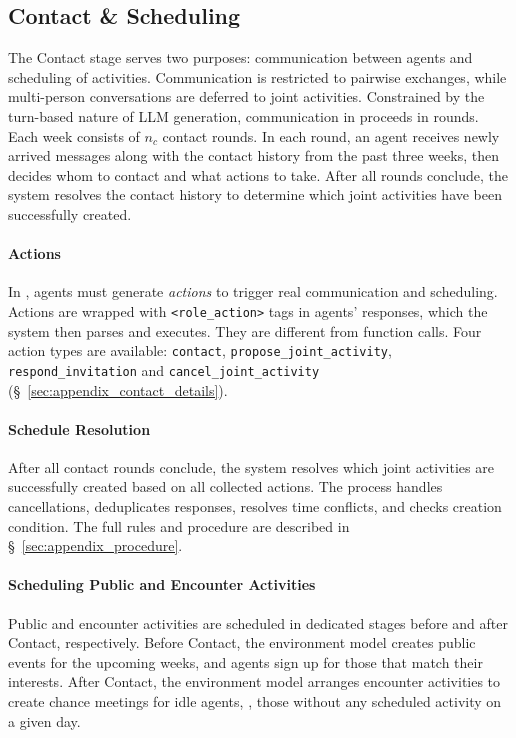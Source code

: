 \subsection{Contact \& Scheduling}
\label{sec:contact}

The Contact stage serves two purposes: communication between agents and scheduling of activities.
Communication is restricted to pairwise exchanges, while multi-person conversations are deferred to joint activities.
Constrained by the turn-based nature of LLM generation, communication in \method proceeds in rounds.
Each week consists of $n_c$ contact rounds.
In each round, an agent receives newly arrived messages along with the contact history from the past three weeks, then decides whom to contact and what actions to take.
After all rounds conclude, the system resolves the contact history to determine which joint activities have been successfully created.

\paragraph{Actions}
In \method, agents must generate \textit{actions} to trigger real communication and scheduling.
Actions are wrapped with \texttt{<role\_action>} tags in agents' responses, which the system then parses and executes.
They are different from function calls.
Four action types are available: \texttt{contact}, \texttt{propose\_joint\_activity}, \texttt{respond\_invitation} and \texttt{cancel\_joint\_activity} (\S~\ref{sec:appendix_contact_details}).

\paragraph{Schedule Resolution} After all contact rounds conclude, the system resolves which joint activities are successfully created based on all collected actions.
The process handles cancellations, deduplicates responses, resolves time conflicts, and checks creation condition. 
The full rules and procedure are described in \S~\ref{sec:appendix_procedure}.

\paragraph{Scheduling Public and Encounter Activities}
Public and encounter activities are scheduled in dedicated stages before and after Contact, respectively.
Before Contact, the environment model creates public events for the upcoming weeks, and agents sign up for those that match their interests.
After Contact, the environment model arranges encounter activities to create chance meetings for idle agents, \ie, those without any scheduled activity on a given day.

